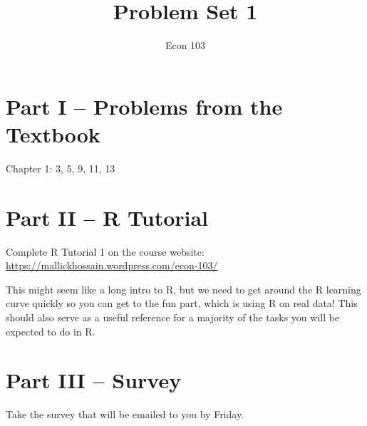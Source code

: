 \documentclass[addpoints,12pt]{exam}
\title{Problem Set 1}
\author{Econ 103}
\date{}
\begin{document}
\maketitle

\section*{Part I -- Problems from the Textbook}
Chapter 1: 3, 5, 9, 11, 13

 \section*{Part II -- R Tutorial}
Complete R Tutorial 1 on the course website:
\\
\url{https://mallickhossain.wordpress.com/econ-103/}

This might seem like a long intro to R, but we need to get around the R learning curve quickly so you can get to the fun part, which is using R on real data! This should also serve as a useful reference for a majority of the tasks you will be expected to do in R.

\section*{Part III -- Survey}
Take the survey that will be emailed to you by Friday.
\end{document}
